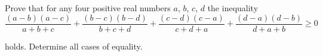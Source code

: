Prove that for any four positive real numbers $ a$,  $ b$,  $ c$,  $ d$ the inequality\[ \frac {(a - b)(a - c)}{a + b + c} + \frac {(b - c)(b - d)}{b + c + d} + \frac {(c - d)(c - a)}{c + d + a} + \frac {(d - a)(d - b)}{d + a + b}\ge 0\]

holds. Determine all cases of equality.